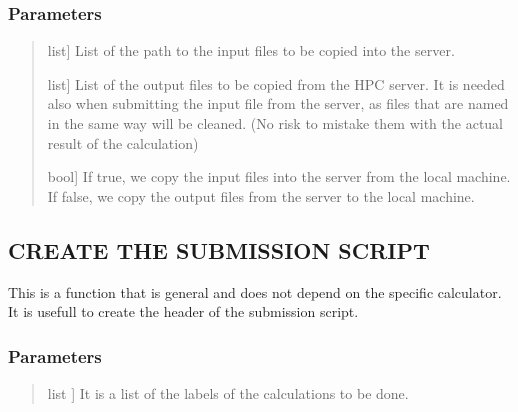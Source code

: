\documentclass[a4paper,11pt,english]{sphinxmanual}
\begin{document}
\begin{fulllineitems}
\begin{fulllineitems}
\subsubsection{Parameters}
\label{\detokenize{apireference:id54}}\begin{quote}
\begin{description}
\sphinxlineitem{list\_of\_input}{[}list{]}
\sphinxAtStartPar
List of the path to the input files to be copied into the server.

\sphinxlineitem{list\_of\_output}{[}list{]}
\sphinxAtStartPar
List of the output files to be copied from the HPC server.
It is needed also when submitting the input file from the server,
as files that are named in the same way will be cleaned.
(No risk to mistake them with the actual result of the calculation)

\sphinxlineitem{to\_server}{[}bool{]}
\sphinxAtStartPar
If true, we copy the input files into the server from the local machine.
If false, we copy the output files from the server to the local machine.

\end{description}
\end{quote}

\end{fulllineitems}


\begin{fulllineitems}
\label{\detokenize{apireference:sscha.Cluster.Cluster.create_submission_script}}
\pysigstartsignatures
{}
\pysigstopsignatures

\subsection{CREATE THE SUBMISSION SCRIPT}
\label{\detokenize{apireference:create-the-submission-script}}
\sphinxAtStartPar
This is a function that is general and does not depend on the specific
calculator. It is usefull to create the header of the submission script.


\subsubsection{Parameters}
\label{\detokenize{apireference:id55}}\begin{quote}
\begin{description}
\sphinxlineitem{labels}{[}list {]}
\sphinxAtStartPar
It is a list of the labels of the calculations to be done.


\end{description}
\end{quote}
\end{fulllineitems}
\end{fulllineitems}
\end{document}
